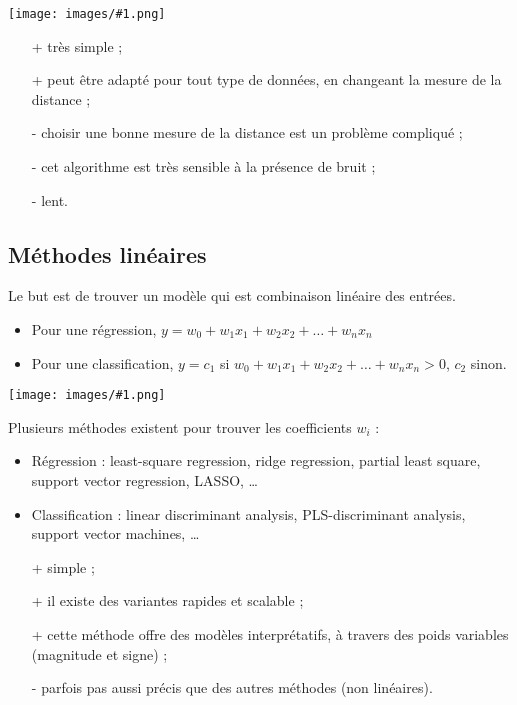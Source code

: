 \documentclass[10pt,a4paper]{report}
\newcommand{\dessin}[1]{\begin{center}\texttt{[image: images/\#1.png]}\end{center}}
\begin{document}
		\dessin{12}
		
		\begin{itemize}
			\item[+] très simple ;
			\item[+] peut être adapté pour tout type de données, en changeant la mesure de la distance ;
			\item[-] choisir une bonne mesure de la distance est un problème compliqué ;
			\item[-] cet algorithme est très sensible à la présence de bruit ;
			\item[-] lent.
		\end{itemize}
	
		\subsection{Méthodes linéaires}
		
		Le but est de trouver un modèle qui est combinaison linéaire des entrées.
		
		\begin{itemize}
			\item Pour une régression, $y = w_0 + w_1 x_1 + w_2 x_2 + \dots + w_n x_n$
			\item Pour une classification, $y = c_1$ si $w_0 + w_1 x_1 + w_2 x_2 + \dots + w_n x_n > 0$, $c_2$ sinon.
		\end{itemize}
		
		\dessin{13}
		
		Plusieurs méthodes existent pour trouver les coefficients $w_i$ : 
		
		\begin{itemize}
			\item Régression : least-square regression, ridge regression, partial least square, support vector regression, LASSO, \dots
			\item Classification : linear discriminant analysis, PLS-discriminant analysis, support vector machines, \dots \\
		\end{itemize} 
		
		\begin{itemize}
			\item[+] simple ;
			\item[+] il existe des variantes rapides et scalable ;
			\item[+] cette méthode offre des modèles interprétatifs, à travers des poids variables (magnitude et signe) ;
			\item[-] parfois pas aussi précis que des autres méthodes (non linéaires).
		\end{itemize}
		
\end{document}
